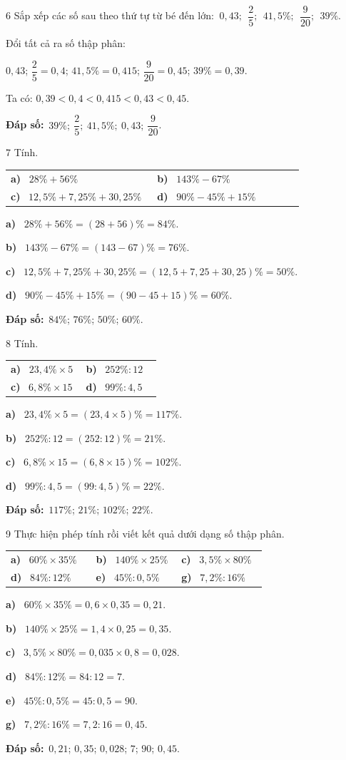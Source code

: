 \documentclass[11pt]{article}
\makeatletter
\newif\ifsol \solfalse
\renewcommand{\arraystretch}{1.35}
\providecommand{\AnsWord}{Đáp số}
\newcommand{\dapso}[1]{\par\textbf{\AnsWord:}\ #1}
\newcommand{\probsol}[1]{%
  \begin{lrbox}{\solmeasure}\begin{minipage}{\dimexpr\linewidth-24pt\relax}#1\end{minipage}\end{lrbox}%
  \ifsol
    \begin{solbox}#1\end{solbox}%
  \else
    \setlength{\solht}{\dimexpr\ht\solmeasure+\dp\solmeasure+0.85cm\relax}%
    \ifdim\solht<1.35cm\setlength{\solht}{1.35cm}\fi
    \begin{tcolorbox}[colback=white,colframe=Line,boxrule=0.8pt,arc=5pt,
      left=8pt,right=8pt,top=4pt,bottom=4pt,height=\solht]{\footnotesize\color{Slate}\itshape\WorkWord}\end{tcolorbox}%
  \fi}
\newcommand{\pa}[1]{\textbf{#1)}\ }
\newenvironment{cols2}{\par\vspace{3pt}\noindent\setlength{\tabcolsep}{0pt}\renewcommand{\arraystretch}{1.3}%
  \begin{tabular}{@{}>{\raggedright\arraybackslash\rule{0pt}{4.4ex}}p{0.48\linewidth}<{\rule[-2.3ex]{0pt}{0pt}}@{\hspace{0.03\linewidth}}>{\raggedright\arraybackslash\rule{0pt}{4.4ex}}p{0.48\linewidth}<{\rule[-2.3ex]{0pt}{0pt}}@{}}}%
  {\end{tabular}\par}
\newenvironment{cols3}{\par\vspace{3pt}\noindent\setlength{\tabcolsep}{0pt}\renewcommand{\arraystretch}{1.3}%
  \begin{tabular}{@{}>{\raggedright\arraybackslash\rule{0pt}{4.4ex}}p{0.32\linewidth}<{\rule[-2.3ex]{0pt}{0pt}}@{\hspace{0.015\linewidth}}>{\raggedright\arraybackslash\rule{0pt}{4.4ex}}p{0.32\linewidth}<{\rule[-2.3ex]{0pt}{0pt}}@{\hspace{0.015\linewidth}}>{\raggedright\arraybackslash\rule{0pt}{4.4ex}}p{0.32\linewidth}<{\rule[-2.3ex]{0pt}{0pt}}@{}}}%
  {\end{tabular}\par}
\newcommand{\gap}{\vspace{0.3cm}}
\def\WorkWord{Bài làm:}
\def\AnsWord{Đáp số}
\makeatother
\begin{document}
\gap
\begin{probbox}{6}{\relax}
Sắp xếp các số sau theo thứ tự từ bé đến lớn: $\ 0{,}43;\ \ \dfrac25;\ \ 41{,}5\%;\ \ \dfrac9{20};\ \ 39\%$.
\end{probbox}
\probsol{
Đổi tất cả ra số thập phân:\par
$0{,}43$; \quad $\dfrac25=0{,}4$; \quad $41{,}5\%=0{,}415$; \quad $\dfrac9{20}=0{,}45$; \quad $39\%=0{,}39$.\par
Ta có: $0{,}39<0{,}4<0{,}415<0{,}43<0{,}45$.
\dapso{$39\%;\ \dfrac25;\ 41{,}5\%;\ 0{,}43;\ \dfrac9{20}$.}}
\gap
\begin{probbox}{7}{\relax}
Tính.
\begin{cols2}
\pa{a} $28\%+56\%$ & \pa{b} $143\%-67\%$\\
\pa{c} $12{,}5\%+7{,}25\%+30{,}25\%$ & \pa{d} $90\%-45\%+15\%$
\end{cols2}
\end{probbox}
\probsol{
\pa{a} $28\%+56\%=(28+56)\%=84\%$.\par
\pa{b} $143\%-67\%=(143-67)\%=76\%$.\par
\pa{c} $12{,}5\%+7{,}25\%+30{,}25\%=(12{,}5+7{,}25+30{,}25)\%=50\%$.\par
\pa{d} $90\%-45\%+15\%=(90-45+15)\%=60\%$.
\dapso{$84\%$; $76\%$; $50\%$; $60\%$.}}
\gap
\begin{probbox}{8}{\relax}
Tính.
\begin{cols2}
\pa{a} $23{,}4\%\times5$ & \pa{b} $252\%:12$\\
\pa{c} $6{,}8\%\times15$ & \pa{d} $99\%:4{,}5$
\end{cols2}
\end{probbox}
\probsol{
\pa{a} $23{,}4\%\times5=(23{,}4\times5)\%=117\%$.\par
\pa{b} $252\%:12=(252:12)\%=21\%$.\par
\pa{c} $6{,}8\%\times15=(6{,}8\times15)\%=102\%$.\par
\pa{d} $99\%:4{,}5=(99:4{,}5)\%=22\%$.
\dapso{$117\%$; $21\%$; $102\%$; $22\%$.}}
\gap
\begin{probbox}{9}{\relax}
Thực hiện phép tính rồi viết kết quả dưới dạng số thập phân.
\begin{cols3}
\pa{a} $60\%\times35\%$ & \pa{b} $140\%\times25\%$ & \pa{c} $3{,}5\%\times80\%$\\
\pa{d} $84\%:12\%$ & \pa{e} $45\%:0{,}5\%$ & \pa{g} $7{,}2\%:16\%$
\end{cols3}
\end{probbox}
\probsol{
\pa{a} $60\%\times35\%=0{,}6\times0{,}35=0{,}21$.\par
\pa{b} $140\%\times25\%=1{,}4\times0{,}25=0{,}35$.\par
\pa{c} $3{,}5\%\times80\%=0{,}035\times0{,}8=0{,}028$.\par
\pa{d} $84\%:12\%=84:12=7$.\par
\pa{e} $45\%:0{,}5\%=45:0{,}5=90$.\par
\pa{g} $7{,}2\%:16\%=7{,}2:16=0{,}45$.
\dapso{$0{,}21$; $0{,}35$; $0{,}028$; $7$; $90$; $0{,}45$.}}
\end{document}
